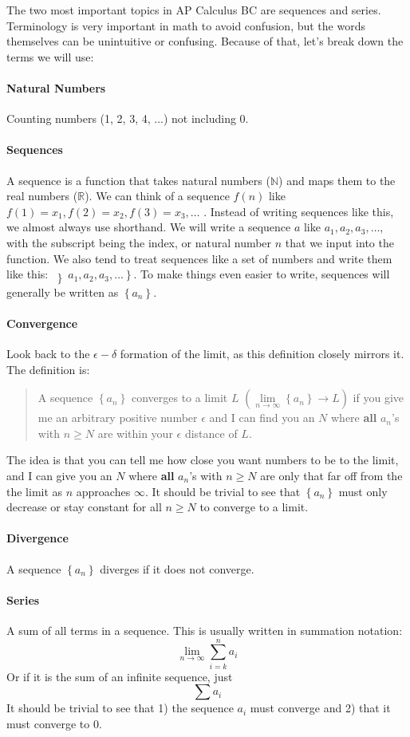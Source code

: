 \documentclass[../revisedMain.tex]{subfiles}
\begin{document}
	The two most important topics in AP Calculus BC are sequences and series. Terminology is very important in math to avoid confusion, but the words themselves can be unintuitive or confusing. Because of that, let's break down the terms we will use:
	\paragraph{Natural Numbers} Counting numbers (1, 2, 3, 4, ...) not including 0.
	\paragraph{Sequences} A sequence is a function that takes natural numbers ($\mathbb{N}$) and maps them to the real numbers ($\mathbb{R}$). We can think of a sequence $f(n)$ like $f(1)=x_1, f(2)=x_2, f(3)=x_3, \ldots$ . Instead of writing sequences like this, we almost always use shorthand. We will write a sequence $a$ like $a_1, a_2, a_3, \ldots$, with the subscript being the index, or natural number $n$ that we input into the function. We also tend to treat sequences like a set of numbers and write them like this: $\left\rbrace  a_1, a_2, a_3, \ldots \right\rbrace$. To make things even easier to write, sequences will generally be written as $\left\lbrace a_n \right\rbrace$.
	\paragraph{Convergence} Look back to the $\epsilon-\delta$ formation of the limit, as this definition closely mirrors it. The definition is:
	\begin{quote}
		A sequence $\left\lbrace a_n\right\rbrace$ converges to a limit $L$ $\left(\displaystyle\lim\limits_{n\to\infty}\left\lbrace a_n \right\rbrace\to L\right)$ if you give me an arbitrary positive number $\epsilon$ and I can find you an $N$ where \textbf{all} $a_n$'s with $n\ge N$ are within your $\epsilon$ distance of $L$.
	\end{quote} 
	The idea is that you can tell me how close you want numbers to be to the limit, and I can give you an $N$ where \textbf{all} $a_n$'s with $n\ge N$ are only that far off from the the limit as $n$ approaches $\infty$. It should be trivial to see that $\left\lbrace a_n \right\rbrace$ must only decrease or stay constant for all $n\ge N$ to converge to a limit.
	\paragraph{Divergence} A sequence $\left\lbrace a_n \right\rbrace$ diverges if it does not converge.
	\paragraph{Series} A sum of all terms in a sequence. This is usually written in summation notation:\[\lim\limits_{n\to\infty}\sum_{i=k}^{n} a_i\] Or if it is the sum of an infinite sequence, just \[\sum a_i\] It should be trivial to see that 1) the sequence $a_i$ must converge and 2) that it must converge to $0$.
	
\end{document}
